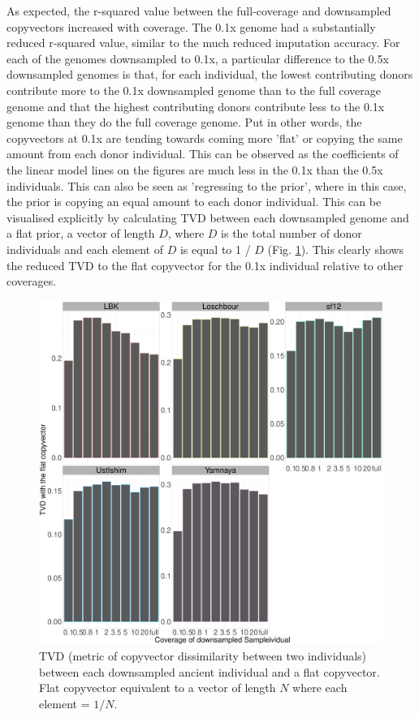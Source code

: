 As expected, the r-squared value between the full-coverage and downsampled copyvectors increased with coverage. The 0.1x genome had a substantially reduced r-squared value, similar to the much reduced imputation accuracy. For each of the genomes downsampled to 0.1x, a particular difference to the 0.5x downsampled genomes is that, for each individual, the lowest contributing donors contribute more to the 0.1x downsampled genome than to the full coverage genome and that the highest contributing donors contribute less to the 0.1x genome than they do the full coverage genome. Put in other words, the copyvectors at 0.1x are tending towards coming more 'flat' or copying the same amount from each donor individual. This can be observed as the coefficients of the linear model lines on the figures are much less in the 0.1x than the 0.5x individuals. This can also be seen as 'regressing to the prior', where in this case, the prior is copying an equal amount to each donor individual. This can be visualised explicitly by calculating TVD between each downsampled genome and a flat prior, a vector of length $D$, where $D$ is the total number of donor individuals and each element of $D$ is equal to 1 / $D$ (Fig. \ref{fig:TVD_ancients_flat_prior}). This clearly shows the reduced TVD to the flat copyvector for the 0.1x individual relative to other coverages.

\begin{figure}[htp]
    \centering
    \includegraphics[width=1.0\textwidth]{../images/chapter1/TVD_ancients_flat_prior.pdf}
    \caption{TVD (metric of copyvector dissimilarity between two individuals) between each downsampled ancient individual and a flat copyvector. Flat copyvector equivalent to a vector of length $N$ where each element = $1/N$.}
    \label{fig:TVD_ancients_flat_prior}
\end{figure}

